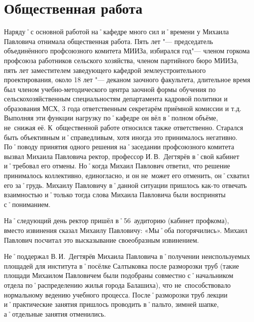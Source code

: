 \section*{Общественная работа}
\label{sec:socialWork}

Наряду˚с основной работой на˚кафедре много сил и˚времени у Михаила Павловича отнимала общественная работа. Пять лет "---  председатель объединённого профсоюзного комитета МИИЗа, избирался год"--- членом горкома профсоюза работников сельского хозяйства, членом партийного бюро МИИЗа, пять лет заместителем заведующего кафедрой землеустроительного проектирования, около 18 лет "--- деканом заочного факультета, длительное время был членом учебно-методического центра заочной формы обучения по сельскохозяйственным специальностям департамента кадровой политики и образования МСХ, 3 года ответственным секретарём приёмной комиссии и т.д. 
Выполняя эти функции  нагрузку по˚кафедре он вёл в˚полном объёме, не~снижая её. К~общественной работе относился также ответственно. Старался быть объективным и˚справедливым, хотя иногда это принималось негативно. По˚поводу принятия одного решения на˚заседании профсоюзного комитета вызвал Михаила Павловича ректор, профессор И.\,В.~Дегтярёв в˚свой кабинет и˚требовал его отмены. Но˚когда Михаил Павлович ответил, что решение принималось коллективно, единогласно, и он не~может его отменить, он˚схватил его за˚грудь. Михаилу Павловичу в˚данной ситуации пришлось как-то отвечать взаимностью и˚только тогда слова Михаила Павловича были восприняты с˚пониманием.

На˚следующий день ректор пришёл в˚56~аудиторию (кабинет профкома), вместо извинения сказал Михаилу Павловичу: «Мы˚оба погорячились». Михаил Павлович посчитал это высказывание своеобразным извинением.

Не˚поддержал В.\,И.~Дегтярёв Михаила Павловича в˚получении неиспользуемых площадей для института в˚посёлке Салтыковка после разморозки труб (такие площади Михаилом Павловичем были подобраны совместно с˚начальником отдела по˚распределению жилья города Балашиха), что не~способствовало нормальному ведению учебного процесса. После˚разморозки труб лекции и˚практические занятия пришлось проводить в˚пальто, зимней шапке, а˚отдельные занятия отменились.

